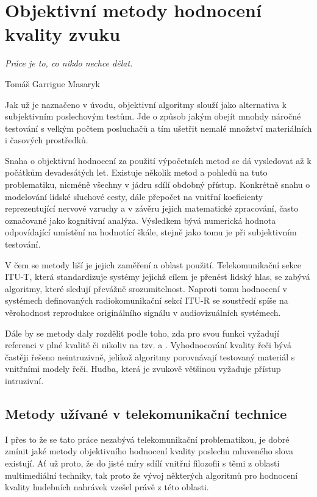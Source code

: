 \chapter{Objektivní metody hodnocení kvality zvuku}
\label{chap:objectiveMetods}

\epigraph{\hfill\textit{Práce je to, co nikdo nechce dělat.}}{Tomáš Garrigue Masaryk}

Jak už je naznačeno v úvodu, objektivní algoritmy slouží jako alternativa k subjektivním poslechovým testům. Jde o způsob jakým obejít mnohdy náročné testování s velkým počtem posluchačů a tím ušetřit nemalé množství materiálních i časových prostředků.

Snaha o objektivní hodnocení za použití výpočetních metod se dá vysledovat až k počátkům devadesátých let. Existuje několik metod a pohledů na tuto problematiku, nicméně všechny v jádru sdílí obdobný přístup. Konkrétně snahu o modelování lidské sluchové cesty, dále přepočet na vnitřní koeficienty reprezentující nervové vzruchy a v závěru jejich matematické zpracování, často označované jako kognitivní analýza. Výsledkem bývá numerická hodnota odpovídající umístění na hodnotící škále, stejně jako tomu je při subjektivním testování.

V čem se metody liší je jejich zaměření a oblast použití. Telekomunikační sekce ITU-T, která standardizuje systémy jejichž cílem je přenést lidský hlas, se zabývá algoritmy, které sledují převážně srozumitelnost. Naproti tomu hodnocení v systémech definovaných radiokomunikační sekcí ITU-R se soustředí spíše na věrohodnost reprodukce originálního signálu v audiovizuálních systémech.

Dále by se metody daly rozdělit podle toho, zda pro svou funkci vyžadují referenci v plné kvalitě či nikoliv na tzv.  a . Vyhodnocování kvality řeči bývá častěji řešeno neintruzivně, jelikož algoritmy porovnávají testovaný materiál s vnitřními modely řeči. Hudba, která je zvukově  většinou vyžaduje přístup intruzivní.

\section{Metody užívané v telekomunikační technice}

I přes to že se tato práce nezabývá telekomunikační problematikou, je dobré zmínit jaké metody objektivního hodnocení kvality poslechu mluveného slova existují. Ať už proto, že do jisté míry sdílí vnitřní filozofii s těmi z oblasti multimediální techniky, tak proto že vývoj některých algoritmů pro hodnocení kvality hudebních nahrávek vzešel právě z této oblasti. 

